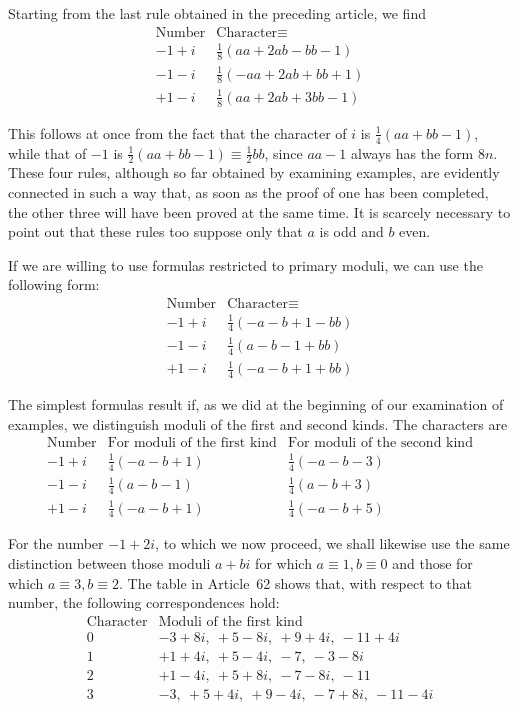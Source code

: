 %
Starting from the last rule obtained in the preceding article, we find
\[
\begin{array}{c|l}
\text{Number}&\text{Character}\equiv\\\hline
-1+i&\frac18(aa+2ab-bb-1)\\
-1-i&\frac18(-aa+2ab+bb+1)\\
+1-i&\frac18(aa+2ab+3bb-1)
\end{array}
\]

This follows at once from the fact that the character of $i$ is $\frac14(aa+bb-1)$, while that of $-1$ is $\frac12(aa+bb-1)\equiv\frac12bb$, since $aa-1$ always has the form $8n$. These four rules, although so far obtained by examining examples, are evidently connected in such a way that, as soon as the proof of one has been completed, the other three will have been proved at the same time. It is scarcely necessary to point out that these rules too suppose only that $a$ is odd and $b$ even.

If we are willing to use formulas restricted to primary moduli, we can use the following form:
\[
\begin{array}{c|l}
\text{Number}&\text{Character}\equiv\\\hline
-1+i&\frac14(-a-b+1-bb)\\
-1-i&\frac14(a-b-1+bb)\\
+1-i&\frac14(-a-b+1+bb)
\end{array}
\]

The simplest formulas result if, as we did at the beginning of our examination of examples, we distinguish moduli of the first and second kinds. The characters are
\[
\begin{array}{c|c|c}
\text{Number}&\text{For moduli of the first kind}&\text{For moduli of the second kind}\\\hline
-1+i&\frac14(-a-b+1)&\frac14(-a-b-3)\\
-1-i&\frac14(a-b-1)&\frac14(a-b+3)\\
+1-i&\frac14(-a-b+1)&\frac14(-a-b+5)
\end{array}
\]

For the number $-1+2i$, to which we now proceed, we shall likewise use the same distinction between those moduli $a+bi$ for which $a\equiv1,b\equiv0$ and those for which $a\equiv3,b\equiv2$. The table in Article~62 shows that, with respect to that number, the following correspondences hold:
%
\[
\begin{array}{c|l}
\text{Character}&\text{Moduli of the first kind}\\\hline
0&-3+8i,\ +5-8i,\ +9+4i,\ -11+4i\\
1&+1+4i,\ +5-4i,\ -7,\ -3-8i\\
2&+1-4i,\ +5+8i,\ -7-8i,\ -11\\
3&-3,\ +5+4i,\ +9-4i,\ -7+8i,\ -11-4i
\end{array}
\]

